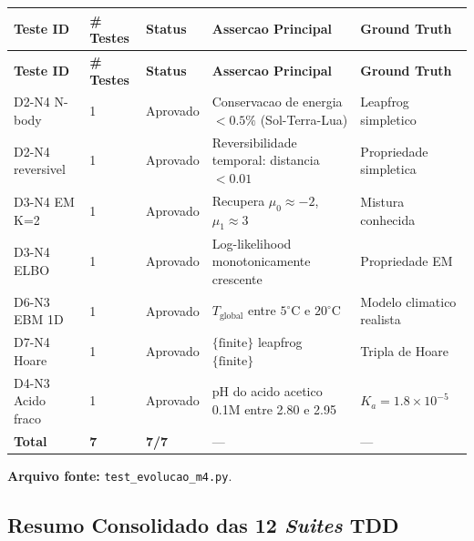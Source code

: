 \begin{longtable}{|p{2.5cm}|p{2.0cm}|p{2.0cm}|p{3.5cm}|p{3.5cm}|}
\hline
\textbf{Teste ID} & \textbf{\# Testes} & \textbf{Status} & \textbf{Assercao Principal} & \textbf{Ground Truth} \\
\hline
\endfirsthead
\hline
\textbf{Teste ID} & \textbf{\# Testes} & \textbf{Status} & \textbf{Assercao Principal} & \textbf{Ground Truth} \\
\hline
\endhead
\hline
\endfoot
D2-N4 N-body & 1 & Aprovado & Conservacao de energia $<0.5\%$ (Sol-Terra-Lua) & Leapfrog simpletico \\
\hline
D2-N4 reversivel & 1 & Aprovado & Reversibilidade temporal: distancia $<0.01$ & Propriedade simpletica \\
\hline
D3-N4 EM K=2 & 1 & Aprovado & Recupera $\mu_{0}\approx -2$, $\mu_{1}\approx 3$ & Mistura conhecida \\
\hline
D3-N4 ELBO & 1 & Aprovado & Log-likelihood monotonicamente crescente & Propriedade EM \\
\hline
D6-N3 EBM 1D & 1 & Aprovado & $T_{\text{global}}$ entre $5^{\circ}\text{C}$ e $20^{\circ}\text{C}$ & Modelo climatico realista \\
\hline
D7-N4 Hoare & 1 & Aprovado & $\{\text{finite}\}$ leapfrog $\{\text{finite}\}$ & Tripla de Hoare \\
\hline
D4-N3 Acido fraco & 1 & Aprovado & pH do acido acetico 0.1M entre 2.80 e 2.95 & $K_{a}=1.8\times 10^{-5}$ \\
\hline
\textbf{Total} & \textbf{7} & \textbf{7/7} & --- & --- \\
\hline
\end{longtable}

\textbf{Arquivo fonte:} \texttt{test\_evolucao\_m4.py}.

\subsection{Resumo Consolidado das 12 \textit{Suites} TDD}

